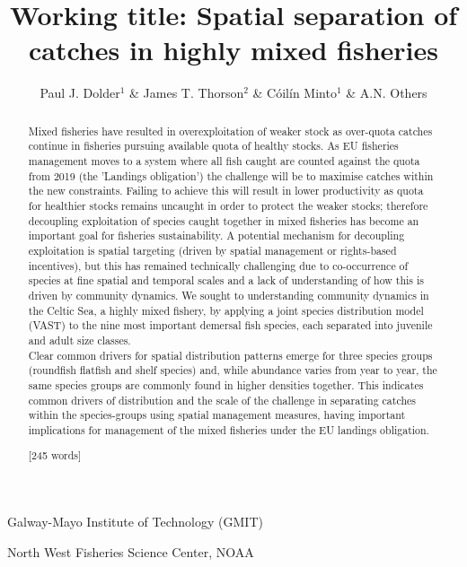 \documentclass{nature}
\title{Working title: Spatial separation of catches in highly mixed fisheries}
\author{Paul J. Dolder$^1$ \& James T. Thorson$^2$ \& Cóilín Minto$^1$ \& A.N.
Others}
\begin{document}
\maketitle

\begin{affiliations}
\item Galway-Mayo Institute of Technology (GMIT) 
\item North West Fisheries Science Center, NOAA
\end{affiliations}

\begin{linenumbers}

\begin{abstract} 
Mixed fisheries have resulted in overexploitation of weaker stock as over-quota
catches continue in fisheries pursuing available quota of healthy stocks. As EU
fisheries management moves to a system where all fish caught are counted
against the quota from 2019 (the 'Landings obligation') the challenge will be
to maximise catches within the new constraints. Failing to achieve this will
result in lower productivity as quota for healthier stocks remains uncaught in
order to protect the weaker stocks; therefore decoupling exploitation of
species caught together in mixed fisheries has become an important goal for
fisheries sustainability.  A potential mechanism for decoupling exploitation is
spatial targeting (driven by spatial management or rights-based incentives), but this has remained technically challenging due to
co-occurrence of species at fine spatial and temporal scales and a lack of
understanding of how this is driven by community dynamics.  We sought to
understanding community dynamics in the Celtic Sea, a highly mixed fishery, by
applying a joint species distribution model (VAST) to the nine most important
demersal fish species, each separated into juvenile and adult size classes.  \\

Clear common drivers for spatial distribution patterns emerge for three species
groups (roundfish flatfish and shelf species) and, while abundance varies from
year to year, the same species groups are commonly found in higher densities
together. This indicates common drivers of distribution and the scale of the
challenge in separating catches within the species-groups using spatial
management measures, having important implications for management of the mixed
fisheries under the EU landings obligation.

[245 words]


\end{abstract}
\end{linenumbers}
\end{document}
